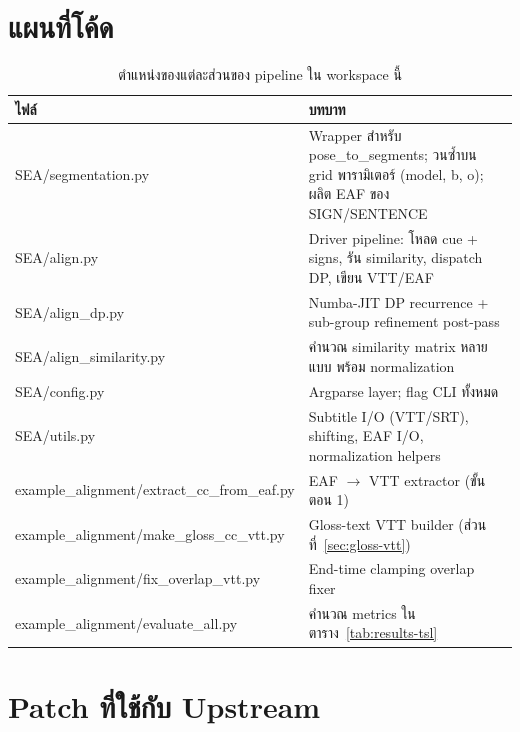 \documentclass[11pt,a4paper]{article}
\def\texttt#1{#1}%
\def\textbf#1{#1}%
\begin{document}
\section{แผนที่โค้ด}

\begin{table}[h]
\centering
\small
\begin{tabularx}{\linewidth}{lX}
\toprule
\textbf{ไฟล์} & \textbf{บทบาท} \\
\midrule
\texttt{SEA/segmentation.py}        & Wrapper สำหรับ \texttt{pose\_to\_segments}; วนซ้ำบน grid พารามิเตอร์ (model, b, o); ผลิต EAF ของ \texttt{SIGN}/\texttt{SENTENCE} \\
\texttt{SEA/align.py}               & Driver pipeline: โหลด cue + signs, รัน similarity, dispatch DP, เขียน VTT/EAF \\
\texttt{SEA/align\_dp.py}           & Numba-JIT DP recurrence + sub-group refinement post-pass \\
\texttt{SEA/align\_similarity.py}   & คำนวณ similarity matrix หลายแบบ พร้อม normalization \\
\texttt{SEA/config.py}              & Argparse layer; flag CLI ทั้งหมด \\
\texttt{SEA/utils.py}               & Subtitle I/O (VTT/SRT), shifting, EAF I/O, normalization helpers \\
\texttt{example\_alignment/extract\_cc\_from\_eaf.py} & EAF $\to$ VTT extractor (ขั้นตอน 1) \\
\texttt{example\_alignment/make\_gloss\_cc\_vtt.py}   & Gloss-text VTT builder (ส่วนที่~\ref{sec:gloss-vtt}) \\
\texttt{example\_alignment/fix\_overlap\_vtt.py}      & End-time clamping overlap fixer \\
\texttt{example\_alignment/evaluate\_all.py}          & คำนวณ metrics ในตาราง~\ref{tab:results-tsl} \\
\bottomrule
\end{tabularx}
\caption{ตำแหน่งของแต่ละส่วนของ pipeline ใน workspace นี้}
\label{tab:code-map}
\end{table}


\section{Patch ที่ใช้กับ Upstream}
\label{sec:patches}
\end{document}
